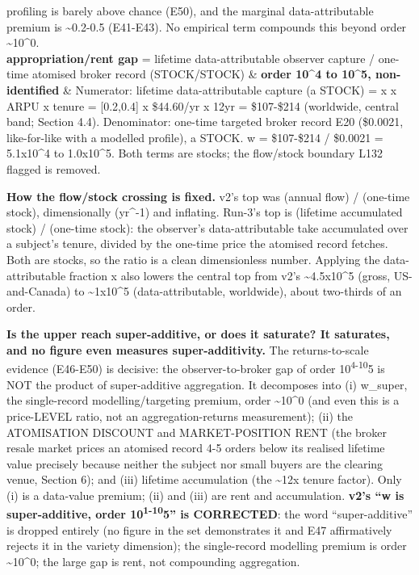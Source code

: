 \documentclass[
  11pt,
]{article}
\begin{document}
{\begin{longtable}[]
profiling is barely above chance (E50), and the marginal
data-attributable premium is \textasciitilde0.2-0.5 (E41-E43). No
empirical term compounds this beyond order \textasciitilde10\^{}0. \\
\textbf{appropriation/rent gap} = lifetime data-attributable observer
capture / one-time atomised broker record (STOCK/STOCK) & \textbf{order
10\^{}4 to 10\^{}5, non-identified} & Numerator: lifetime
data-attributable capture (a STOCK) = x x ARPU x tenure = {[}0.2,0.4{]}
x \$44.60/yr x 12yr = \$107-\$214 (worldwide, central band; Section
4.4). Denominator: one-time targeted broker record E20 (\$0.0021,
like-for-like with a modelled profile), a STOCK. w = \$107-\$214 /
\$0.0021 = 5.1x10\^{}4 to 1.0x10\^{}5. Both terms are stocks; the
flow/stock boundary L132 flagged is removed. \\
\end{longtable}
}

\textbf{How the flow/stock crossing is fixed.} v2's top was (annual
flow) / (one-time stock), dimensionally (yr\^{}-1) and inflating.
Run-3's top is (lifetime accumulated stock) / (one-time stock): the
observer's data-attributable take accumulated over a subject's tenure,
divided by the one-time price the atomised record fetches. Both are
stocks, so the ratio is a clean dimensionless number. Applying the
data-attributable fraction x also lowers the central top from v2's
\textasciitilde4.5x10\^{}5 (gross, US-and-Canada) to
\textasciitilde1x10\^{}5 (data-attributable, worldwide), about
two-thirds of an order.

\textbf{Is the upper reach super-additive, or does it saturate? It
saturates, and no figure even measures super-additivity.} The
returns-to-scale evidence (E46-E50) is decisive: the observer-to-broker
gap of order 10\textsuperscript{4-10}5 is NOT the product of
super-additive aggregation. It decomposes into (i) w\_super, the
single-record modelling/targeting premium, order \textasciitilde10\^{}0
(and even this is a price-LEVEL ratio, not an aggregation-returns
measurement); (ii) the ATOMISATION DISCOUNT and MARKET-POSITION RENT
(the broker resale market prices an atomised record 4-5 orders below its
realised lifetime value precisely because neither the subject nor small
buyers are the clearing venue, Section 6); and (iii) lifetime
accumulation (the \textasciitilde12x tenure factor). Only (i) is a
data-value premium; (ii) and (iii) are rent and accumulation.
\textbf{v2's ``w is super-additive, order 10\textsuperscript{1-10}5'' is
CORRECTED}: the word ``super-additive'' is dropped entirely (no figure
in the set demonstrates it and E47 affirmatively rejects it in the
variety dimension); the single-record modelling premium is order
\textasciitilde10\^{}0; the large gap is rent, not compounding
aggregation.
\end{document}
